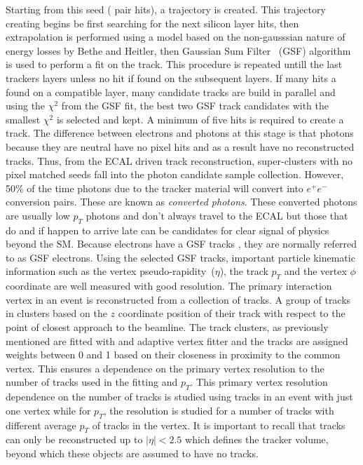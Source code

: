 Starting from this seed ( pair hits), a trajectory is created. This trajectory creating begins be first searching for the next silicon layer hits, then extrapolation is performed using a model based on the non-gausssian nature of energy losses by Bethe and Heitler, then Gaussian Sum Filter ~(GSF) algorithm is used to perform a fit on the track. This procedure is repeated untill the last trackers layers  unless no hit if found on the subsequent layers. If many hits a found on a compatible layer, many candidate tracks are build in parallel and using the $\chi^{2}$ from the GSF fit, the best two GSF track candidates with the smallest  $\chi^{2}$ is selected and kept. A minimum of five hits is required to create a track. The difference between electrons and photons at this stage is that photons because they are neutral have no pixel hits and as a result have no reconstructed tracks. Thus, from the ECAL driven track reconstruction, super-clusters with no pixel matched seeds fall into the photon candidate sample collection. However, 50\% of the time photons due to the tracker material will convert into $e^{+}e^{-}$ conversion pairs. These are known as \textit{converted photons}. These converted photons are usually low $p_{T}$ photons and don't always travel to the ECAL but those that do and if happen to arrive late can be candidates for clear signal of physics beyond the SM. Because electrons have a GSF tracks , they are normally referred to as GSF electrons.   Using the selected GSF tracks, important particle kinematic information such as the vertex pseudo-rapidity~($\eta$), the track $p_{T}$ and the vertex $\phi$ coordinate are well measured with good resolution.
\newline
The primary interaction vertex in an event is reconstructed from a collection of tracks. A group of tracks in clusters based on the $z$ coordinate position of their track with respect to the point of closest approach to the beamline. The track clusters, as previously mentioned are fitted with and adaptive vertex fitter and the tracks are assigned  weights between 0 and 1 based on their closeness in proximity to the common vertex. This ensures a dependence on the primary vertex resolution to the number of tracks used in the fitting and $p_{T}$. This primary vertex resolution dependence on the number of tracks is studied using tracks in an event with just one vertex while for $p_{T}$, the resolution is studied for a number of tracks with different average $p_{T}$ of tracks in the vertex. It is important to recall that tracks can only be reconstructed up to $|\eta| < 2.5$  which defines the tracker volume, beyond which these objects are assumed to have no tracks.

